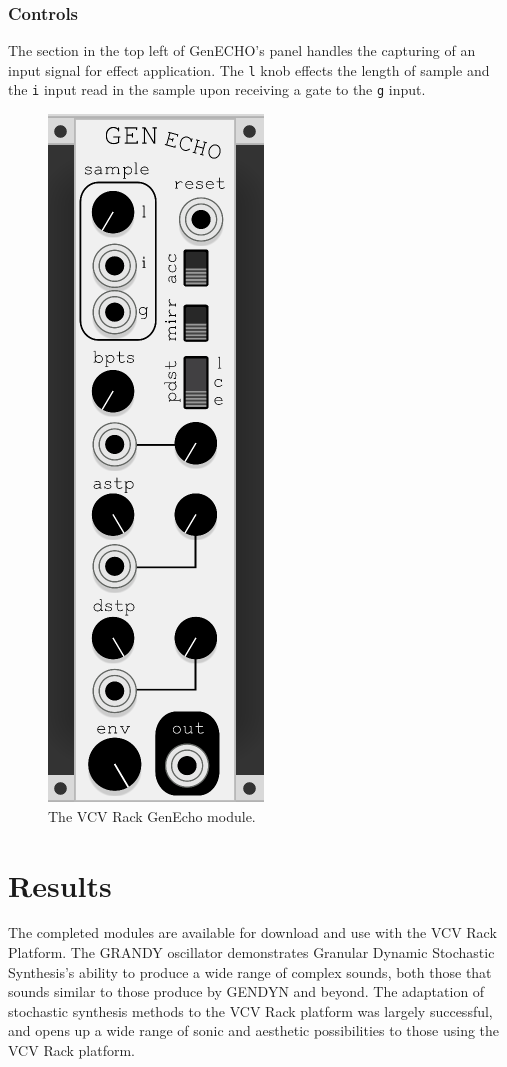 \documentclass[10pt]{article}
\begin{document}
\subsubsection{Controls}
The section in the top left of GenECHO's panel handles the capturing of an input signal for effect application. The \texttt{l} knob effects the length of sample and the \texttt{i} input read in the sample upon receiving a gate to the \texttt{g} input.

\begin{figure}
  \caption{The VCV Rack GenEcho module.}
  \centering
    \includegraphics[height=0.25\textheight]{genecho}
\end{figure}

\section{Results}
The completed modules are available for download and use with the VCV Rack Platform. The GRANDY oscillator demonstrates Granular Dynamic Stochastic Synthesis's ability to produce a wide range of complex sounds, both those that sounds similar to those produce by GENDYN and beyond. The adaptation of stochastic synthesis methods to the VCV Rack platform was largely successful, and opens up a wide range of sonic and aesthetic possibilities to those using the VCV Rack platform. 
\end{document}
